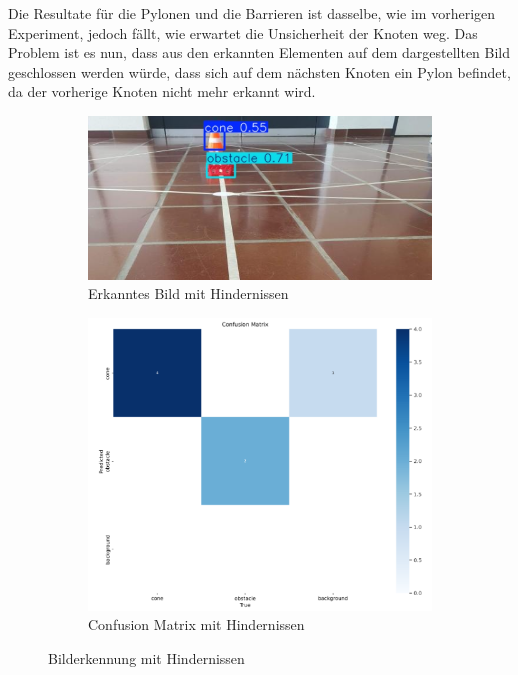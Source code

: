 Die Resultate für die Pylonen und die Barrieren ist dasselbe, wie im vorherigen Experiment, jedoch fällt, wie erwartet die Unsicherheit der Knoten weg. Das Problem ist es nun, dass aus den erkannten Elementen auf dem dargestellten Bild geschlossen werden würde, dass sich auf dem nächsten Knoten ein Pylon befindet, da der vorherige Knoten nicht mehr erkannt wird.

\begin{figure}[H]
\begin{subfigure}{0.5\textwidth}
\includegraphics[width=0.95\linewidth]{assets/informatik-prototyp/yolo/cone-obst-recognition.png} 
\caption{Erkanntes Bild mit Hindernissen}
\label{fig:image-recognition-with-cone-obst}
\end{subfigure}
\begin{subfigure}{0.5\textwidth}
\includegraphics[width=0.95\linewidth]{assets/informatik-prototyp/yolo/cone-obst-conf-matrix.png} 
\caption{Confusion Matrix mit Hindernissen}
\label{fig:conf-matrix-cone-obst}
\end{subfigure}

\caption{Bilderkennung mit Hindernissen}
\label{fig:recognition-with-cone-obst}
\end{figure}



